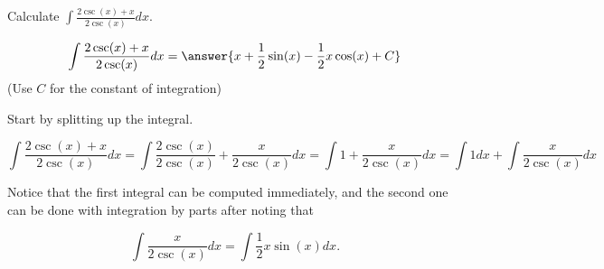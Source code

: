 \documentclass{ximera}
\author{Jim Talamo}
\begin{document}
\begin{exercise}
Calculate $\int \frac{2 \csc(x)+x}{2\csc(x)} dx $.


\[
\int \frac{2 \csc(x)+x}{2\csc(x)} dx  = \answer{x+\frac{1}{2} \sin(x)-\frac{1}{2} x \cos(x)+ C } 
\]
(Use $C$ for the constant of integration)

\begin{hint}
Start by splitting up the integral.

\[
\int \frac{2 \csc(x)+x}{2\csc(x)} dx = \int \frac{2 \csc(x)}{2\csc(x)}+\frac{x}{2\csc(x)} dx =\int 1 +\frac{x}{2\csc(x)} dx  = \int 1 dx +\int \frac{x}{2\csc(x)} dx\]

Notice that the first integral can be computed immediately, and the second one can be done with integration by parts after noting that

\[
\int \frac{x}{2\csc(x)} dx = \int \frac{1}{2}x\sin(x) dx.
\]
\end{hint}

\end{exercise}
\end{document}
